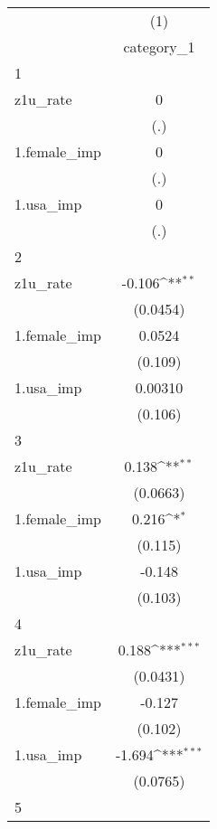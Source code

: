{
\def\sym#1{\ifmmode^{#1}\else\(^{#1}\)\fi}
\begin{tabular}{l*{1}{c}}
\hline\hline
            &\multicolumn{1}{c}{(1)}\\
            &\multicolumn{1}{c}{category\_1}\\
\hline
1           &                     \\
z1u\_rate    &           0         \\
            &         (.)         \\
[1em]
1.female\_imp&           0         \\
            &         (.)         \\
[1em]
1.usa\_imp   &           0         \\
            &         (.)         \\
\hline
2           &                     \\
z1u\_rate    &      -0.106\sym{**} \\
            &    (0.0454)         \\
[1em]
1.female\_imp&      0.0524         \\
            &     (0.109)         \\
[1em]
1.usa\_imp   &     0.00310         \\
            &     (0.106)         \\
\hline
3           &                     \\
z1u\_rate    &       0.138\sym{**} \\
            &    (0.0663)         \\
[1em]
1.female\_imp&       0.216\sym{*}  \\
            &     (0.115)         \\
[1em]
1.usa\_imp   &      -0.148         \\
            &     (0.103)         \\
\hline
4           &                     \\
z1u\_rate    &       0.188\sym{***}\\
            &    (0.0431)         \\
[1em]
1.female\_imp&      -0.127         \\
            &     (0.102)         \\
[1em]
1.usa\_imp   &      -1.694\sym{***}\\
            &    (0.0765)         \\
\hline
5           &                     \\

\end{tabular}}
